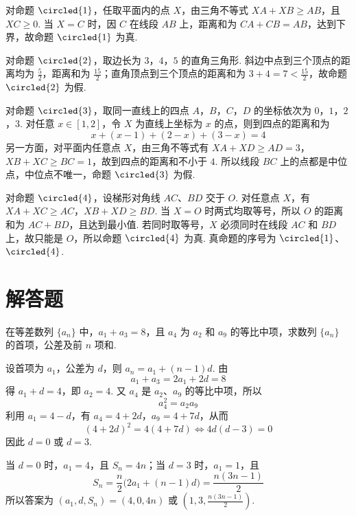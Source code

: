 \begin{solution}
对命题 \(\circled{1}\)，任取平面内的点 \(X\)，由三角不等式
\(XA+XB\geqslant AB\)，且 \(XC\geqslant0\). 当 \(X=C\) 时，因 \(C\) 在线段 \(AB\) 上，距离和为 \(CA+CB=AB\)，达到下界，故命题 \(\circled{1}\) 为真.

对命题 \(\circled{2}\)，取边长为 \(3\)，\(4\)，\(5\) 的直角三角形. 斜边中点到三个顶点的距离均为 \(\frac52\)，距离和为 \(\frac{15}{2}\)；直角顶点到三个顶点的距离和为 \(3+4=7<\frac{15}{2}\)，故命题 \(\circled{2}\) 为假.

对命题 \(\circled{3}\)，取同一直线上的四点 \(A\)，\(B\)，\(C\)，\(D\) 的坐标依次为 \(0\)，\(1\)，\(2\)，\(3\). 对任意 \(x\in[1,2]\)，令 \(X\) 为直线上坐标为 \(x\) 的点，则到四点的距离和为
\[
x+(x-1)+(2-x)+(3-x)=4
\]
另一方面，对平面内任意点 \(X\)，由三角不等式有 \(XA+XD\geqslant AD=3\)，\(XB+XC\geqslant BC=1\)，故到四点的距离和不小于 \(4\). 所以线段 \(BC\) 上的点都是中位点，中位点不唯一，命题 \(\circled{3}\) 为假.

对命题 \(\circled{4}\)，设梯形对角线 \(AC\)、\(BD\) 交于 \(O\). 对任意点 \(X\)，有 \(XA+XC\geqslant AC\)，\(XB+XD\geqslant BD\). 当 \(X=O\) 时两式均取等号，所以 \(O\) 的距离和为 \(AC+BD\)，且达到最小值. 若同时取等号，\(X\) 必须同时在线段 \(AC\) 和 \(BD\) 上，故只能是 \(O\)，所以命题 \(\circled{4}\) 为真. 真命题的序号为 \(\circled{1}\)、\(\circled{4}\).
\end{solution}

\section{解答题}

\begin{problem}
在等差数列 \(\{a_{n}\}\) 中，\(a_{1} + a_{3} = 8\)，且 \(a_{4}\) 为 \(a_{2}\) 和 \(a_{9}\) 的等比中项，求数列 \(\{a_{n}\}\) 的首项，公差及前 \(n\) 项和.
\end{problem}

\begin{solution}
设首项为 \(a_1\)，公差为 \(d\)，则 \(a_n=a_1+(n-1)d\). 由
\[
a_1+a_3=2a_1+2d=8
\]
得 \(a_1+d=4\)，即 \(a_2=4\). 又 \(a_4\) 是 \(a_2\)、\(a_9\) 的等比中项，所以
\[
a_4^2=a_2a_9
\]
利用 \(a_1=4-d\)，有 \(a_4=4+2d\)，\(a_9=4+7d\)，从而
\[
(4+2d)^2=4(4+7d)
\iff 4d(d-3)=0
\]
因此 \(d=0\) 或 \(d=3\).

当 \(d=0\) 时，\(a_1=4\)，且 \(S_n=4n\)；当 \(d=3\) 时，\(a_1=1\)，且
\[
S_n=\frac n2\bigl(2a_1+(n-1)d\bigr)=\frac{n(3n-1)}2
\]
所以答案为 \((a_1,d,S_n)=(4,0,4n)\) 或 \((1,3,\frac{n(3n-1)}2)\).
\end{solution}

